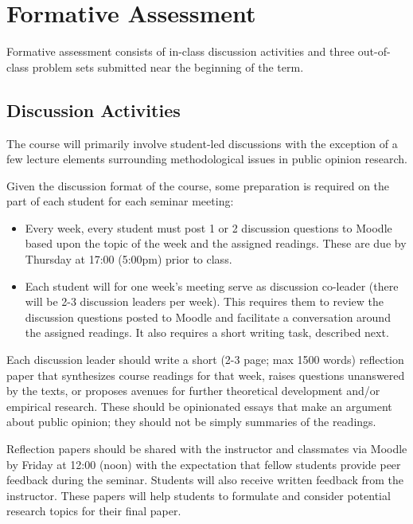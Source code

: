 \documentclass[12pt,a4paper]{article}
\begin{document}
\section{Formative Assessment}

Formative assessment consists of in-class discussion activities and three out-of-class problem sets submitted near the beginning of the term.

\subsection{Discussion Activities}

The course will primarily involve student-led discussions with the exception of a few lecture elements surrounding methodological issues in public opinion research.

Given the discussion format of the course, some preparation is required on the part of each student for each seminar meeting:

\begin{itemize}
\item Every week, every student must post 1 or 2 discussion questions to Moodle based upon the topic of the week and the assigned readings. These are due by Thursday at 17:00 (5:00pm) prior to class.
\item Each student will for one week's meeting serve as discussion co-leader (there will be 2-3 discussion leaders per week). This requires them to review the discussion questions posted to Moodle and facilitate a conversation around the assigned readings. It also requires a short writing task, described next. 
\end{itemize}

Each discussion leader should write a short (2-3 page; max 1500 words) reflection paper that synthesizes course readings for that week, raises questions unanswered by the texts, or proposes avenues for further theoretical development and/or empirical research. These should be opinionated essays that make an argument about public opinion; they should not be simply summaries of the readings.

Reflection papers should be shared with the instructor and classmates via Moodle by Friday at 12:00 (noon) with the expectation that fellow students provide peer feedback during the seminar. Students will also receive written feedback from the instructor. These papers will help students to formulate and consider potential research topics for their final paper.
\end{document}
